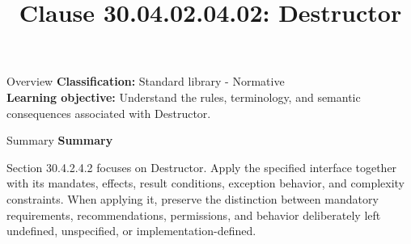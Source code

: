\documentclass[10pt,letterpaper]{article}
\title{Clause 30.04.02.04.02: Destructor}
\author{}
\date{}
\begin{document}
\maketitle
\begin{CornellOverviewBox}{Overview}
\textbf{Classification:} Standard library - Normative\\[2pt]
\textbf{Learning objective:} Understand the rules, terminology, and semantic consequences associated with Destructor.
\end{CornellOverviewBox}\begin{CornellSummaryBox}{Summary}
{\sffamily\bfseries\color{Accent} Summary}\par\vspace{3pt}Section 30.4.2.4.2 focuses on Destructor. Apply the specified interface together with its mandates, effects, result conditions, exception behavior, and complexity constraints. When applying it, preserve the distinction between mandatory requirements, recommendations, permissions, and behavior deliberately left undefined, unspecified, or implementation-defined.
\end{CornellSummaryBox}
\end{document}
